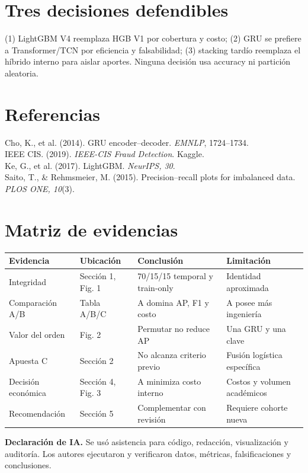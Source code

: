 \documentclass[9.5pt]{article}
\begin{document}
\section*{Tres decisiones defendibles} (1) LightGBM V4 reemplaza HGB V1 por cobertura y costo; (2) GRU se prefiere a Transformer/TCN por eficiencia y falsabilidad; (3) stacking tardío reemplaza el híbrido interno para aislar aportes. Ninguna decisión usa accuracy ni partición aleatoria.

\section*{Referencias}\small Cho, K., et al. (2014). GRU encoder--decoder. \textit{EMNLP}, 1724--1734.\\IEEE CIS. (2019). \textit{IEEE-CIS Fraud Detection}. Kaggle.\\Ke, G., et al. (2017). LightGBM. \textit{NeurIPS, 30}.\\Saito, T., \& Rehmsmeier, M. (2015). Precision--recall plots for imbalanced data. \textit{PLOS ONE, 10}(3).
\newpage
\section*{Matriz de evidencias}\small
\begin{tabularx}{\linewidth}{p{2.5cm}p{2.7cm}X X}\toprule Evidencia&Ubicación&Conclusión&Limitación\\\midrule
Integridad&Sección 1, Fig. 1&70/15/15 temporal y train-only&Identidad aproximada\\
Comparación A/B&Tabla A/B/C&A domina AP, F1 y costo&A posee más ingeniería\\
Valor del orden&Fig. 2&Permutar no reduce AP&Una GRU y una clave\\
Apuesta C&Sección 2&No alcanza criterio previo&Fusión logística específica\\
Decisión económica&Sección 4, Fig. 3&A minimiza costo interno&Costos y volumen académicos\\
Recomendación&Sección 5&Complementar con revisión&Requiere cohorte nueva\\\bottomrule\end{tabularx}

\vfill\textbf{Declaración de IA.} Se usó asistencia para código, redacción, visualización y auditoría. Los autores ejecutaron y verificaron datos, métricas, falsificaciones y conclusiones.
\end{document}

